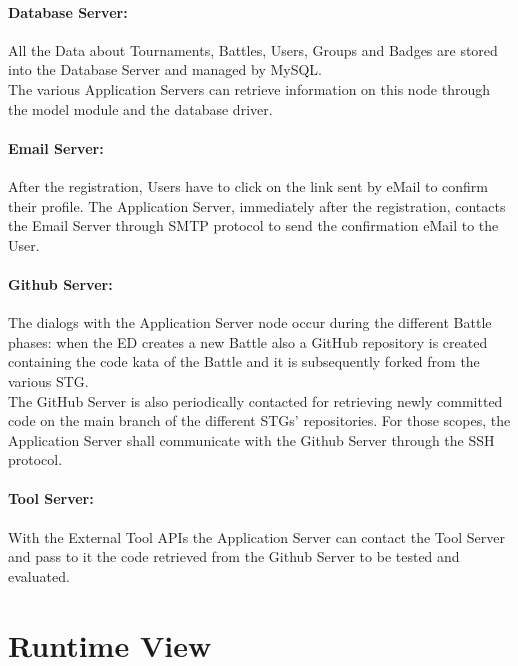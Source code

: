 \paragraph{Database Server:}
All the Data about Tournaments, Battles, Users, Groups and Badges are stored into the Database Server and managed by MySQL.\\
The various Application Servers can retrieve information on this node through the model module and the database driver.

\paragraph{Email Server:}
After the registration, Users have to click on the link sent by eMail to confirm their profile. The Application Server, immediately after the registration, contacts the Email Server through SMTP protocol to send the confirmation eMail to the User.

\paragraph{Github Server:}
The dialogs with the Application Server node occur during the different Battle phases: when the ED creates a new Battle also a GitHub repository is created containing the code kata of the Battle and it is subsequently forked from the various STG.\\
The GitHub Server is also periodically contacted for retrieving newly committed code on the main branch of the different STGs' repositories.
For those scopes, the Application Server shall communicate with the Github Server through the SSH protocol.


\paragraph{Tool Server:}
With the External Tool APIs the Application Server can contact the Tool Server and pass to it the code retrieved from the Github Server to be tested and evaluated.

\newpage
\section{Runtime View}
\label{sec:runtime_view}%


